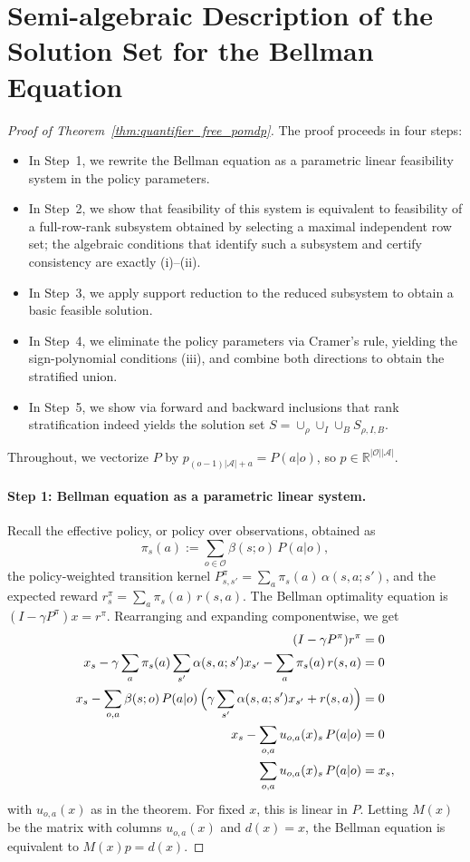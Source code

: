 \documentclass{article}
\theoremstyle{definition}
\theoremstyle{remark}
\begin{document}
\newpage 
\section{Semi-algebraic Description of the Solution Set for the Bellman Equation}  
\label{app:semi}

\thmquantifierfreepomdp*

\begin{proof}[Proof of Theorem~\ref{thm:quantifier_free_pomdp}]
The proof proceeds in four steps: 
\begin{itemize}
    \item In Step~1, we rewrite the Bellman equation as a parametric linear feasibility system in the policy parameters. 
    \item In Step~2, we show that feasibility of this system is equivalent to feasibility of a full-row-rank subsystem obtained by selecting a maximal independent row set; the algebraic conditions that identify such a subsystem and certify consistency are exactly (i)--(ii). 
    \item In Step~3, we apply support reduction to the reduced subsystem to obtain a basic feasible solution. 
    \item In Step~4, we eliminate the policy parameters via Cramer's rule, yielding the sign-polynomial conditions (iii), and combine both directions to obtain the stratified union.
    \item In Step~5, we show via forward and backward inclusions that rank stratification indeed yields the solution set $S = \cup_\rho \cup_I \cup_B S_{\rho, I, B}$.
\end{itemize}

Throughout, we vectorize $P$ by $p_{(o-1)\vert \mathcal A\vert +a}=P(a |  o)$, so $p\in\mathbb R^{\vert \mathcal O\vert \vert \mathcal A\vert }$. 

\paragraph{Step 1: Bellman equation as a parametric linear system.}
Recall the effective policy, or policy over observations, obtained as
\[
\pi_s(a) := \sum_{o\in\mathcal O}\beta(s;o)\,P(a |  o),
\]
the policy-weighted transition kernel $P^\pi_{s,s'}=\sum_a \pi_s(a)\,\alpha(s,a;s')$, and the expected reward $r^\pi_s=\sum_a \pi_s(a)\,r(s,a)$. The Bellman optimality equation is $(I-\gamma P^\pi)x = r^\pi$. Rearranging and expanding componentwise, we get
\begin{align*}
    (I - \gamma P^\pi)r^\pi &= 0\\
    x_s - \gamma\sum_{a}\pi_s(a)\sum_{s'}\alpha(s,a;s')x_{s'} - \sum_a \pi_s(a)\,r(s,a) &= 0\\
    x_s - \sum_{o,a}\beta(s;o)\,P(a |  o)\,\Bigl(\gamma\sum_{s'}\alpha(s,a;s')x_{s'} + r(s,a)\Bigr)  &= 0\\
    x_s - \sum_{o,a} u_{o,a}(x)_s\, P(a |  o) &= 0 \\
    \sum_{o,a} u_{o,a}(x)_s\, P(a |  o) &= x_s,
\end{align*}
with $u_{o,a}(x)$ as in the theorem. For fixed $x$, this is linear in $P$. Letting $M(x)$ be the matrix with columns $u_{o,a}(x)$ and $d(x)=x$, the Bellman equation is equivalent to $M(x)p = d(x)$.


\end{proof}
\end{document}

